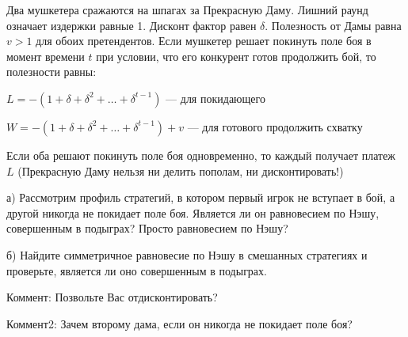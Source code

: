 \begin{problem}
 Два мушкетера сражаются на шпагах за Прекрасную Даму. Лишний раунд
означает издержки равные 1. Дисконт фактор равен $\delta$.
Полезность от Дамы равна $v>1$ для обоих претендентов. Если мушкетер
решает покинуть поле боя в момент времени $t$ при условии, что его
конкурент готов продолжить бой, то полезности равны: \par
$L=-(1+\delta+\delta^{2}+\ldots +\delta^{t-1})$ — для покидающего \par
$W=-(1+\delta+\delta^{2}+\ldots +\delta^{t-1})+v$ — для готового
продолжить схватку \par
Если оба решают покинуть поле боя одновременно, то каждый получает
платеж $L$ (Прекрасную Даму нельзя ни делить пополам, ни дисконтировать!) \par
а) Рассмотрим профиль стратегий, в котором первый игрок не
вступает в бой, а другой никогда не покидает поле боя. Является ли
он равновесием по Нэшу, совершенным в подыграх? Просто равновесием
по Нэшу? \par
б) Найдите симметричное равновесие по Нэшу в смешанных стратегиях
и проверьте, является ли оно совершенным в подыграх.

Коммент: Позвольте Вас отдисконтировать?

Коммент2: Зачем второму дама, если он никогда не покидает поле боя?



\begin{sol}

\end{sol}
\end{problem}




